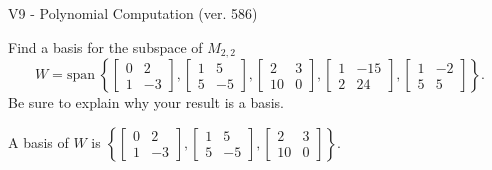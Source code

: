 \begin{exercise}
  \begin{exerciseTitle}V9 - Polynomial Computation (ver. 586)\end{exerciseTitle}
  \begin{exerciseStatement}
    Find a basis for the subspace of \(M_{2,2}\) 
\[W=\mathrm{span}\ \left\{\left[\begin{array}{cc}
0 & 2 \\
1 & -3
\end{array}\right] , \left[\begin{array}{cc}
1 & 5 \\
5 & -5
\end{array}\right] , \left[\begin{array}{cc}
2 & 3 \\
10 & 0
\end{array}\right] , \left[\begin{array}{cc}
1 & -15 \\
2 & 24
\end{array}\right] , \left[\begin{array}{cc}
1 & -2 \\
5 & 5
\end{array}\right]\right\}.\]
 Be sure to explain why your result is a basis.


  \end{exerciseStatement}
  \begin{exerciseAnswer}
   A basis of \(W\) is  \(\left\{\left[\begin{array}{cc}
0 & 2 \\
1 & -3
\end{array}\right] , \left[\begin{array}{cc}
1 & 5 \\
5 & -5
\end{array}\right] , \left[\begin{array}{cc}
2 & 3 \\
10 & 0
\end{array}\right]\right\}\).
  


  \end{exerciseAnswer}
\end{exercise}